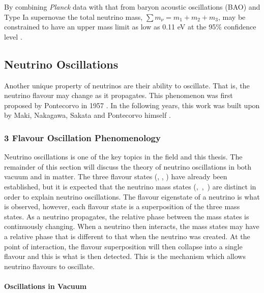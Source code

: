 By combining \textit{Planck} data with that from baryon acoustic oscillations (BAO) and Type Ia supernovae the total neutrino mass, $\sum m_\nu = m_1 + m_2 + m_3$, may be constrained to have an upper mass limit as low as 0.11 eV at the 95\% confidence level \cite{PDG_2022}\cite{planck_2018}.

\subsection{Neutrino Oscillations}\label{subsec:Neutrino Oscillations}

Another unique property of neutrinos are their ability to oscillate. That is, the neutrino flavour may change as it propagates. This phenomenon was first proposed by Pontecorvo in 1957 \cite{Pontecorvo}. In the following years, this work was built upon by Maki, Nakagawa, Sakata and Pontecorvo himself \cite{MNS_oscillations}. 

\subsubsection{3 Flavour Oscillation Phenomenology}

Neutrino oscillations is one of the key topics in the field and this thesis. The remainder of this section will discuss the theory of neutrino oscillations in both vacuum and in matter. The three flavour states (\nue, \numu, \nutau) have already been established,
but it is expected that the neutrino mass states \mbox{(\nuone, \nutwo, \nuthree)} are distinct in order to explain neutrino oscillations. The flavour eigenstate of a neutrino is what is observed, however, each flavour state is a superposition of the three mass states. As a neutrino propagates, the relative phase between the mass states is continuously changing. When a neutrino then interacts, the mass states may have a relative phase that is different to that when the neutrino was created. At the point of interaction, the flavour superposition will then collapse into a single flavour and this is what is then detected. This is the mechanism which allows neutrino flavours to oscillate. 

\paragraph{Oscillations in Vacuum}



